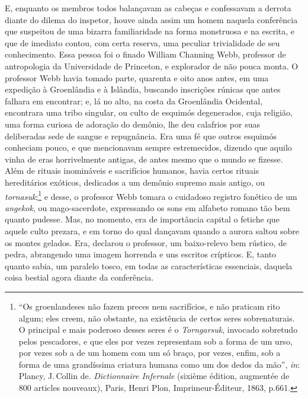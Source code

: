 E, enquanto os membros todos balançavam as cabeças e confessavam a
derrota diante do dilema do inspetor, houve ainda assim um homem naquela
conferência que suspeitou de uma bizarra familiaridade na forma
monstruosa e na escrita, e que de imediato contou, com certa reserva,
uma peculiar trivialidade de seu conhecimento. Essa pessoa foi o finado
William Channing Webb, professor de antropologia da Universidade de
Princeton, e explorador de não pouca monta. O professor Webb havia
tomado parte, quarenta e oito anos antes, em uma expedição à Groenlândia
e à Islândia, buscando inscrições rúnicas que antes falhara em
encontrar; e, lá no alto, na costa da Groenlândia Ocidental, encontrara
uma tribo singular, ou culto de esquimós degenerados, cuja religião, uma
forma curiosa de adoração do demônio, lhe deu calafrios por suas
deliberadas sede de sangue e repugnância. Era uma fé que outros esquimós
conheciam pouco, e que mencionavam sempre estremecidos, dizendo que
aquilo vinha de eras horrivelmente antigas, de antes mesmo que o mundo
se fizesse. Além de rituais inomináveis e sacrifícios humanos, havia
certos rituais hereditários exóticos, dedicados a um demônio supremo
mais antigo, ou \emph{tornasuk};\footnote{``Os groenlandeses não fazem
  preces nem sacrifícios, e não praticam rito algum; eles creem, não
  obstante, na existência de certos seres sobrenaturais. O principal e
  mais poderoso desses seres é o \emph{Torngarsuk}, invocado sobretudo
  pelos pescadores, e que eles por vezes representam sob a forma de um
  urso, por vezes sob a de um homem com um só braço, por vezes, enfim,
  sob a forma de uma grandíssima criatura humana como um dos dedos da
  mão'', \emph{in}: Plancy, J.\,Collin de. \emph{Dictionnaire Infernale}
  (sixième édition, augmentée de 800 articles nouveaux), Paris, Henri
  Plon, Imprimeur-Éditeur, 1863, p.661.} e desse, o professor Webb
tomara o cuidadoso registro fonético de um \emph{angekok}, ou
mago-sacerdote, expressando os sons em alfabeto romano tão bem quanto
pudesse. Mas, no momento, era de importância capital o fetiche que
aquele culto prezara, e em torno do qual dançavam quando a aurora saltou
sobre os montes gelados. Era, declarou o professor, um baixo-relevo bem
rústico, de pedra, abrangendo uma imagem horrenda e uns escritos
crípticos. E, tanto quanto sabia, um paralelo tosco, em todas as
características essenciais, daquela coisa bestial agora diante da
conferência.

